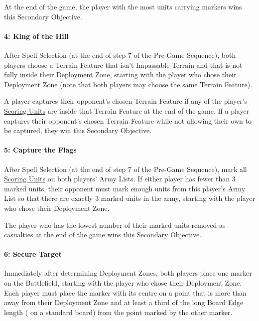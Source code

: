 At the end of the game, the player with the most units carrying markers wins this Secondary Objective.

\columnbreak

\paragraph{4: King of the Hill}

\newline
After Spell Selection (at the end of step 7 of the Pre-Game Sequence), both players choose a Terrain Feature that isn't Impassable Terrain and that is not fully inside their Deployment Zone, starting with the player who chose their Deployment Zone (note that both players may choose the same Terrain Feature).

A player captures their opponent's chosen Terrain Feature if any of the player's \hyperref[scoring]{Scoring Units} are inside that Terrain Feature at the end of the game. If a player captures their opponent's chosen Terrain Feature while not allowing their own to be captured, they win this Secondary Objective.

\paragraph{5: Capture the Flags}

\newline
After Spell Selection (at the end of step 7 of the Pre-Game Sequence), mark all \hyperref[scoring]{Scoring Units} on both players' Army Lists. If either player has fewer than 3 marked units, their opponent must mark enough units from this player's Army List so that there are exactly 3 marked units in the army, starting with the player who chose their Deployment Zone.

The player who has the lowest number of their marked units removed as casualties at the end of the game wins this Secondary Objective.

\paragraph{6: Secure Target}

\newline
Immediately after determining Deployment Zones, both players place one marker on the Battlefield, starting with the player who chose their Deployment Zone. Each player must place the marker with its centre on a point that is more than  away from their Deployment Zone and at least a third of the long Board Edge length ( on a standard board) from the point marked by the other marker.

